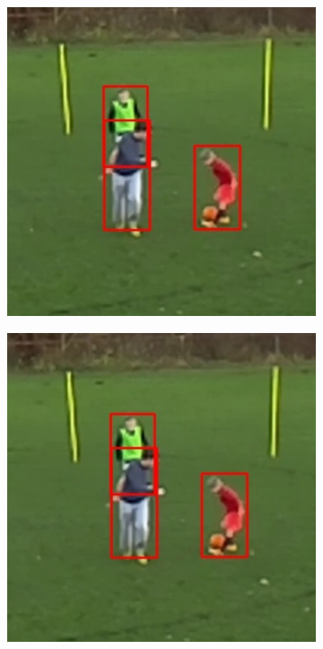 \documentclass{article}
\begin{document}
\begin{figure}[h!]
  \begin{subfigure}[b]{0.5\linewidth}
  \centering
	\includegraphics[scale=0.4]{report/pic/3_new/off_seq_1.jpg} 
  \end{subfigure}
  \begin{subfigure}[b]{0.5\linewidth}
  \centering
	\includegraphics[scale=0.4]{report/pic/3_new/on_seq_1.jpg} 
  \end{subfigure}
    \begin{subfigure}[b]{0.5\linewidth}
  \centering

\end{subfigure}
\end{figure}
\end{document}
